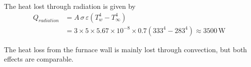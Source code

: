 \documentclass[calculator,datasheet,handbook]{exam}
\begin{document}
\begin{question}
\begin{enumerate}[a)]
\begin{enumerate}[i)]
{        The heat lost through radiation is given by
        \begin{align*}
          Q_{radiation}&=A\,\sigma\,\varepsilon\left(T_w^4-T_\infty^4\right)\\
          &=3\times5\times 5.67\times10^{-8}\times0.7\left(333^4-283^4\right)\approx 3500\,\text{W}
        \end{align*}
        
        The heat loss from the furnace wall is mainly lost through
        convection, but both effects are comparable. 
         }
    \end{enumerate}
  \end{enumerate}
\end{question}

\end{document}
